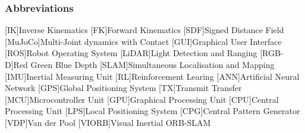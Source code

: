 \begin{Nomencl}[2.75cm]
\end{Nomencl}

\subsubsection*{Abbreviations}
    \hfill\begin{minipage}{\dimexpr\textwidth-\NomLblSep}
        \begin{acronym}[MMMMMMii]
            [IK]{Inverse Kinematics}
            [FK]{Forward Kinematics}
            [SDF]{Signed Distance Field}
            [MuJoCo]{Multi-Joint dynamics with Contact}
            [GUI]{Graphical User Interface}
            [ROS]{Robot Operating System}
            [LiDAR]{Light Detection and Ranging}
            [RGB-D]{Red Green Blue Depth}
            [SLAM]{Simultaneous Localisation and Mapping}
            [IMU]{Inertial Measuring Unit}
            [RL]{Reinforcement Learing}
            [ANN]{Artificial Neural Network}
            [GPS]{Global Positioning System}
            [TX]{Transmit Transfer} 
            [MCU]{Microcontroller Unit}
            [GPU]{Graphical Processing Unit}
            [CPU]{Central Processing Unit}
            [LPS]{Local Positioning System}
            [CPG]{Central Pattern Generator}
            [VDP]{Van der Pool}
            [VIORB]{Visual Inertial ORB-SLAM}
        \end{acronym}       
    \end{minipage}
